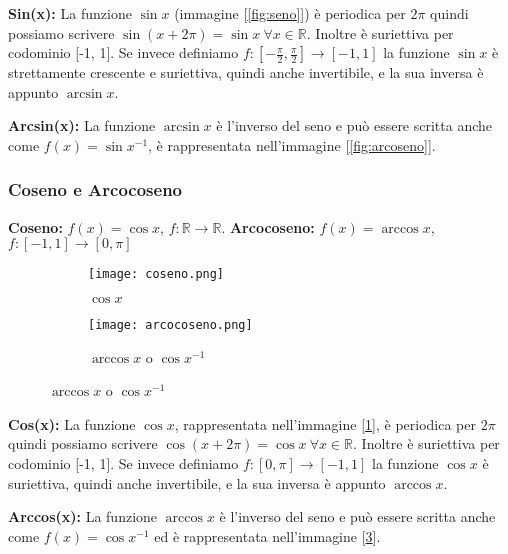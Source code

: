 \begin{observation}
    \textbf{Sin(x):} La funzione $\sin{x}$ (immagine [\ref{fig:seno}]) è periodica per $2\pi$ quindi possiamo scrivere $\sin{(x+2\pi)} = \sin x \: \forall x \in \mathbb{R}$. Inoltre è suriettiva per codominio [-1, 1]. Se invece definiamo $f: [-\frac{\pi}{2}, \frac{\pi}{2}] \longrightarrow [-1, 1]$ la funzione $\sin x$ è strettamente crescente e suriettiva, quindi anche invertibile, e la sua inversa è appunto $\arcsin{x}$.
\end{observation}
\begin{observation}
    \textbf{Arcsin(x):} La funzione $\arcsin{x}$ è l'inverso del seno e può essere scritta anche come $f(x) = \sin{x}^{-1}$, è rappresentata nell'immagine [\ref{fig:arcoseno}].
\end{observation}

\subsubsection{Coseno e Arcocoseno}
\textbf{Coseno:} $f(x) = \cos{x}$, $f: \mathbb{R} \longrightarrow \mathbb{R}$. \hfill
\textbf{Arcocoseno:} $f(x) =\arccos{x}$, $f: [-1, 1] \longrightarrow [0, \pi]$
\begin{figure}[h!]
    \begin{subfigure}{.5\textwidth}
        \centering
        \texttt{[image: coseno.png]}
        \caption{$\cos{x}$}
        \label{fig:coseno}
    \end{subfigure}
    \begin{subfigure}{.5\textwidth}
        \centering
        \texttt{[image: arcocoseno.png]}
        \caption{$\arccos{x}$ o $\cos{x}^{-1}$}
        \label{fig:arcocoseno}
    \end{subfigure}
\end{figure}
\vspace{-5pt}
\begin{observation}
    \textbf{Cos(x):} La funzione $\cos{x}$, rappresentata nell'immagine [\ref{fig:coseno}], è periodica per $2\pi$ quindi possiamo scrivere $\cos{(x+2\pi)} = \cos x \: \forall x \in \mathbb{R}$. Inoltre è suriettiva per codominio [-1, 1]. Se invece definiamo $f: [0, \pi] \longrightarrow [-1, 1]$ la funzione $\cos x$ è suriettiva, quindi anche invertibile, e la sua inversa è appunto $\arccos{x}$.
\end{observation}
\begin{observation}
    \textbf{Arccos(x):} La funzione $\arccos{x}$ è l'inverso del seno e può essere scritta anche come $f(x) = \cos{x}^{-1}$ ed è rappresentata nell'immagine [\ref{fig:arcocoseno}].
\end{observation}

